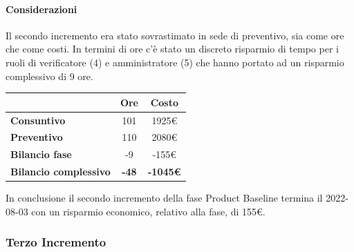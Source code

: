 \paragraph{Considerazioni} \hfill \break
Il secondo incremento era stato sovrastimato in sede di preventivo, sia come ore che come costi. In termini di ore c'è stato un discreto risparmio di tempo per i ruoli di verificatore (4) e amministratore (5) che hanno portato ad un risparmio complessivo di 9 ore.
\begin{center}
	\renewcommand{\arraystretch}{1.8}
	\begin{tabular}{ | l |c|c| }
    \hline
    & \textbf{Ore} & \textbf{Costo} \\
	\hline
    \textbf{Consuntivo} & 101 & 1925\euro \\
    \hline
    \textbf{Preventivo} & 110 & 2080\euro \\
    \hline
    \textbf{Bilancio fase} & -9 & -155\euro \\
    \hline
    \textbf{Bilancio complessivo} & \textbf{-48} & \textbf{-1045\euro} \\
    \hline
    \end{tabular}
\end{center}
In conclusione il secondo incremento della fase Product Baseline termina il 2022-08-03 con un risparmio economico, relativo alla fase, di 155€.

\subsubsection{Terzo Incremento}

